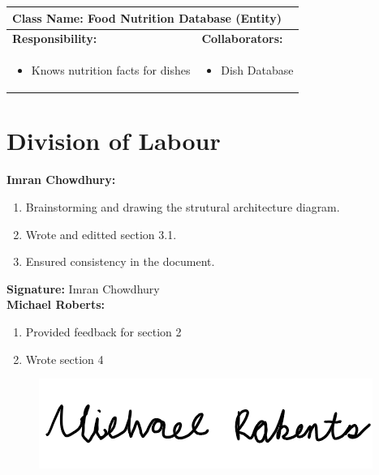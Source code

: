 \documentclass[]{article}
\begin{document}
\begin{table}[H]
	\centering
	\begin{tabular}{|p{7cm}|p{7cm}|}
	\hline 
	 \multicolumn{2}{|l|}{\textbf{Class Name:} Food Nutrition Database (Entity) }\\
	\hline
	\textbf{Responsibility:} & \textbf{Collaborators:} \\
	\hline
	\raggedright
	\begin{itemize}
		\item Knows nutrition facts for dishes
	\end{itemize}
	\vspace{1in} & 
	\begin{itemize}
		\item Dish Database
	\end{itemize} \\
	\hline
	\end{tabular}
\end{table}






\appendix
\section{Division of Labour}
\label{sec:division_of_labour}
\textbf{Imran Chowdhury:}
\begin{enumerate}
	\item Brainstorming and drawing the strutural architecture diagram.
	\item Wrote and editted section 3.1.
	\item Ensured consistency in the document.
\end{enumerate}

\textbf{Signature:} Imran Chowdhury \\

\textbf{Michael Roberts:}
\begin{enumerate}
	\item Provided feedback for section 2
	\item Wrote section 4
\end{enumerate}

\begin{figure}[H]
 	\centering
    \includegraphics[width=\textwidth]{image/A_Michael_Roberts_Signature.png}
\end{figure}
\end{document}
